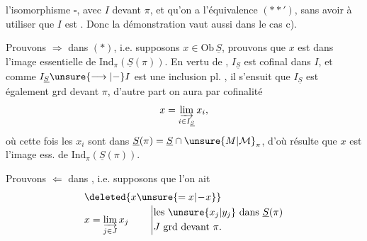 

l'isomorphisme $\square$, avec $I$  devant $\pi$, et qu'on a l'équivalence $(**')$, sans avoir à utiliser que $I$ est . Donc la démonstration vaut aussi dans le cas c).

Prouvons $\Longrightarrow$ dans $(*)$, i.e. supposons $x\in\mathrm{Ob}\,\underline S$, prouvons que $x$ est dans l'image essentielle de $\mathrm{Ind}_\pi(\underline S(\pi))$. En vertu de , $I_{\underline S}$ est cofinal dans $I$, et comme $I_{\underline S}\unsure{\longrightarrow|-}I$ est une inclusion pl. , il s'ensuit que $I_{\underline S}$ est également grd devant $\pi$, d'autre part on aura par cofinalité
\[
x=\varinjlim_{i\in I_{\underline S}}x_i,
\]
où cette fois les $x_i$ sont dans $\underline S(\pi)=\underline S\cap\unsure{M|\mathcal M}_\pi$, d'où résulte que $x$ est  l'image ess. de $\mathrm{Ind}_\pi(\underline S(\pi))$.

Prouvons $\Longleftarrow$ dans \unsure{$(*)$}, i.e. supposons que  l'on ait 
\[
\begin{aligned}
&\deleted{x\unsure{=x|\!-\!x}}\\[-2pt]
&x=\varinjlim_{j\in J}x_j\qquad
\left|\begin{aligned}&\text{les }\unsure{x_j|y_j}\text{ dans }\underline S(\pi)\\
&J\text{ grd devant }\pi.\end{aligned}\right.
\end{aligned}
\]


